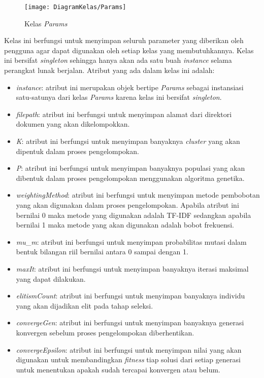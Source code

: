 \begin{figure}[H]
	\begin{center}
		\texttt{[image: DiagramKelas/Params]}
		\caption{Kelas \textit{Params}}
		\label{fig:kelasParams}
	\end{center}
\end{figure}

Kelas ini berfungsi untuk menyimpan seluruh parameter yang diberikan oleh pengguna agar dapat digunakan oleh setiap kelas yang membutuhkannya. Kelas ini bersifat \textit{singleton} sehingga hanya akan ada satu buah \textit{instance} selama perangkat lunak berjalan. Atribut yang ada dalam kelas ini adalah:

\begin{itemize}
	\item \textit{instance}: atribut ini merupakan objek bertipe \textit{Params} sebagai instansiasi satu-satunya dari kelas \textit{Params} karena kelas ini bersifat \textit{singleton}.
	\item \textit{filepath}: atribut ini berfungsi untuk menyimpan alamat dari direktori dokumen yang akan dikelompokkan.
	\item \textit{K}: atribut ini berfungsi untuk menyimpan banyaknya \textit{cluster} yang akan dipentuk dalam proses pengelompokan.
	\item \textit{P}: atribut ini berfungsi untuk menyimpan banyaknya populasi yang akan dibentuk dalam proses pengelompokan menggunakan algoritma genetika.
	\item \textit{weightingMethod}: atribut ini berfungsi untuk menyimpan metode pembobotan yang akan digunakan dalam proses pengelompokan. Apabila atribut ini bernilai 0 maka metode yang digunakan adalah TF-IDF sedangkan apabila bernilai 1 maka metode yang akan digunakan adalah bobot frekuensi.
	\item \textit{mu}\_\textit{m}: atribut ini berfungsi untuk menyimpan probabilitas mutasi dalam bentuk bilangan riil bernilai antara 0 sampai dengan 1.
	\item \textit{maxIt}: atribut ini berfungsi untuk menyimpan banyaknya iterasi maksimal yang dapat dilakukan.
	\item \textit{elitismCount}: atribut ini berfungsi untuk menyimpan banyaknya individu yang akan dijadikan elit pada tahap seleksi.
	\item \textit{convergeGen}: atribut ini berfungsi untuk menyimpan banyaknya generasi konvergen sebelum proses pengelompokan diberhentikan.
	\item \textit{convergeEpsilon}: atribut ini berfungsi untuk menyimpan nilai yang akan digunakan untuk membandingkan \textit{fitness} tiap solusi dari setiap generasi untuk menentukan apakah sudah tercapai konvergen atau belum.
\end{itemize}

